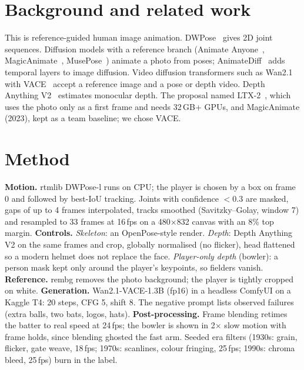 \documentclass[11pt,a4paper,twocolumn]{article}
\begin{document}
\section{Background and related work}
This is reference-guided human image animation. DWPose~\cite{dwpose} gives 2D joint sequences. Diffusion
models with a reference branch (Animate Anyone~\cite{animateanyone}, MagicAnimate~\cite{magicanimate},
MusePose~\cite{musepose}) animate a photo from poses; AnimateDiff~\cite{animatediff} adds temporal layers to
image diffusion. Video diffusion
transformers such as Wan2.1~\cite{wan} with VACE~\cite{vace} accept a reference image and a pose or depth video.
Depth Anything V2~\cite{dav2} estimates monocular depth. The proposal named LTX-2~\cite{ltx2}, which uses the
photo only as a first frame and needs 32\,GB+ GPUs, and MagicAnimate (2023), kept as a team baseline; we
chose VACE.

\section{Method}
\textbf{Motion.} rtmlib DWPose-l runs on CPU; the player is chosen by a box on frame 0 and followed by best-IoU
tracking. Joints with confidence $<0.3$ are masked, gaps of up to 4 frames interpolated, tracks smoothed
(Savitzky--Golay, window 7) and resampled to 33 frames at 16\,fps on a 480$\times$832 canvas with an 8\% top
margin. \textbf{Controls.} \emph{Skeleton}: an OpenPose-style render. \emph{Depth}: Depth Anything V2 on the
same frames and crop, globally normalised (no flicker), head flattened so a modern helmet does not replace the
face. \emph{Player-only depth} (bowler): a person mask kept only around the player's keypoints, so fielders
vanish. \textbf{Reference.} rembg removes the photo background; the
player is tightly cropped on white. \textbf{Generation.} Wan2.1-VACE-1.3B (fp16) in a headless ComfyUI on a
Kaggle T4: 20 steps, CFG 5, shift 8. The negative prompt lists observed failures (extra balls, two bats,
logos, hats). \textbf{Post-processing.} Frame blending retimes the batter to real speed
at 24\,fps; the bowler is shown in 2$\times$ slow motion with frame holds, since blending ghosted the fast arm.
Seeded era filters (1930s: grain, flicker, gate weave, 18\,fps; 1970s: scanlines, colour fringing, 25\,fps;
1990s: chroma bleed, 25\,fps) burn in the label.
\end{document}
